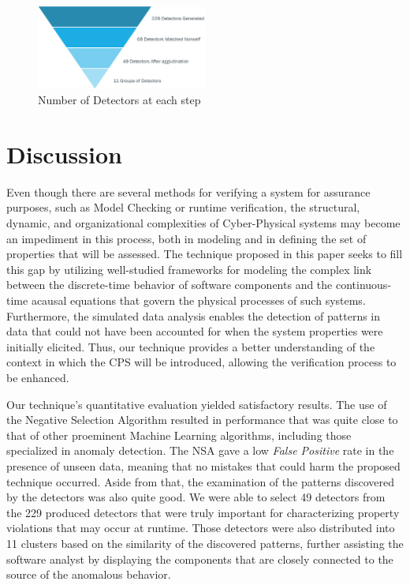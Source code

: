 \begin{figure}[!h]
	\centering
	\includegraphics[width=0.5\textwidth, keepaspectratio]{img/detector_piramid.png}
	\caption{Number of Detectors at each step}
	\label{fig:pyramid}
\end{figure}

\section{Discussion}

Even though there are several methods for verifying a system for assurance purposes, such as Model Checking or runtime verification, the structural, dynamic, and organizational complexities of Cyber-Physical systems may become an impediment in this process, both in modeling and in defining the set of properties that will be assessed. The technique proposed in this paper seeks to fill this gap by utilizing well-studied frameworks for modeling the complex link between the discrete-time behavior of software components and the continuous-time acausal equations that govern the physical processes of such systems. Furthermore, the simulated data analysis enables the detection of patterns in data that could not have been accounted for when the system properties were initially elicited. Thus, our technique provides a better understanding of the context in which the CPS will be introduced, allowing the verification process to be enhanced.

Our technique's quantitative evaluation yielded satisfactory results. The use of the Negative Selection Algorithm resulted in performance that was quite close to that of other proeminent Machine Learning algorithms, including those specialized in anomaly detection. The NSA gave a low \textit{False Positive} rate in the presence of unseen data, meaning that no mistakes that could harm the proposed technique occurred. Aside from that, the examination of the patterns discovered by the detectors was also quite good. We were able to select 49 detectors from the 229 produced detectors that were truly important for characterizing property violations that may occur at runtime. Those detectors were also distributed into 11 clusters based on the similarity of the discovered patterns, further assisting the software analyst by displaying the components that are closely connected to the source of the anomalous behavior.


